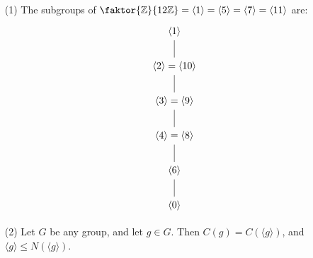 \begin{example}\label{example_2.8}
  \begin{enumerate}
    \item[(1)] The subgroups of $\faktor{\Z}{12\Z}=\langle 1
      \rangle=\langle 5 \rangle= \langle 7 \rangle=\langle 11 \rangle$ are:
      \[\begin{tikzcd}
        {\langle 1 \rangle} \\
        {\langle 2 \rangle=\langle 10 \rangle} \\
        {\langle 3 \rangle=\langle 9 \rangle} \\
        {\langle 4 \rangle=\langle 8 \rangle} \\
        {\langle 6 \rangle} \\
        {\langle 0 \rangle}
        \arrow[no head, from=1-1, to=2-1]
        \arrow[no head, from=2-1, to=3-1]
        \arrow[no head, from=3-1, to=4-1]
        \arrow[no head, from=4-1, to=5-1]
        \arrow[no head, from=5-1, to=6-1]
      \end{tikzcd}\]

    \item[(2)] Let $G$ be any group, and let  $g \in G$. Then
      $C(g)=C(\langle g \rangle)$, and $\langle g \rangle \leq
      N(\langle g \rangle)$.
  \end{enumerate}
\end{example}

